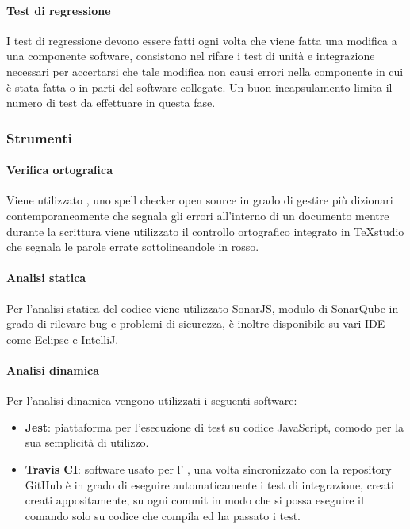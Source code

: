 \paragraph{Test di regressione}	\Spazio
I test di regressione devono essere fatti ogni volta che viene fatta una modifica a una componente software, consistono nel rifare i test di unità e integrazione necessari per accertarsi che tale modifica non causi errori nella componente in cui è stata fatta o in parti del software collegate.
Un buon incapsulamento limita il numero di test da effettuare in questa fase.
\subsubsection{Strumenti}
\paragraph{Verifica ortografica} \Spazio
Viene utilizzato , uno spell checker open source in grado di gestire più dizionari contemporaneamente che segnala gli errori all'interno di un documento mentre durante la scrittura viene utilizzato il controllo ortografico integrato in TeXstudio che segnala le parole errate sottolineandole in rosso.
\paragraph{Analisi statica} \Spazio
Per l'analisi statica del codice  viene utilizzato SonarJS, modulo di SonarQube in grado di rilevare bug e problemi di sicurezza, è inoltre disponibile su vari IDE come Eclipse e IntelliJ.
\paragraph{Analisi dinamica} \Spazio
Per l'analisi dinamica vengono utilizzati i seguenti software:
\begin{itemize}
	\item  \textbf{Jest}: piattaforma per l'esecuzione di test su codice JavaScript, comodo per la sua semplicità di utilizzo.
	\item \textbf{Travis CI}: software usato per l' , una volta sincronizzato con la repository GitHub è in grado di eseguire automaticamente i test di integrazione, creati creati appositamente, su ogni commit in modo che si possa eseguire il comando  solo su codice che compila ed ha passato i test.
\end{itemize}

